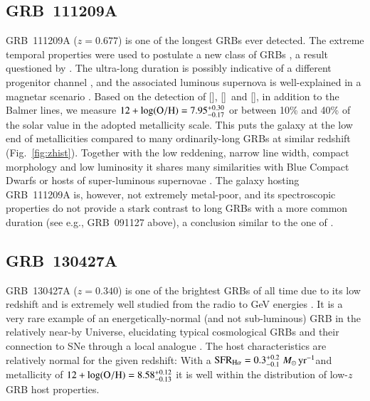 \documentclass[traditabstract, longauth]{aa}
\newcommand{\oh}{12+\log(\rm{O/H})}
\newcommand{\oii}{[\ion{O}{ii}]}
\newcommand{\oiii}{[\ion{O}{iii}]}
\newcommand{\neiii}{[\ion{Ne}{iii}]}
\newcommand{\Msunyr}{$M_\odot\,\rm{yr}^{-1}$}
\begin{document}
\begin{appendix}
\subsection{GRB~111209A} GRB~111209A ($z=0.677$) is one of the longest GRBs ever detected. The extreme temporal properties were used to postulate a new class of GRBs \citep{2013ApJ...766...30G, 2014ApJ...781...13L}, a result questioned by \citet{2013ApJ...778...54V}. The ultra-long duration is possibly indicative of a different progenitor channel \citep{2013ApJ...778...67N}, and the associated luminous supernova is well-explained in a magnetar scenario \citep{2015Kannsubm, 2015Greinersubm}. Based on the detection of \oii, \oiii\, and \neiii, in addition to the Balmer lines, we measure $\oh=7.95_{-0.17}^{+0.30}$ or between 10\% and 40\% of the solar value in the adopted metallicity scale. This puts the galaxy at the low end of metallicities compared to many ordinarily-long GRBs at similar redshift (Fig.~\ref{fig:zhist}). Together with the low reddening, narrow line width, compact morphology and low luminosity \citep{2014ApJ...781...13L} it shares many similarities with Blue Compact Dwarfs \citep[e.g.,][and references therein]{2003ApJS..147...29G} or hosts of super-luminous supernovae \citep[e.g.,][]{2014arXiv1409.8331L}. The galaxy hosting GRB~111209A is, however, not extremely metal-poor, and its spectroscopic properties do not provide a stark contrast to long GRBs with a more common duration (see e.g., GRB~091127 above), a conclusion similar to the one of \citet{2014ApJ...781...13L}.

\subsection{GRB~130427A} GRB~130427A ($z=0.340$) is one of the brightest GRBs of all time due to its low redshift and is extremely well studied from the radio to GeV energies \citep[e.g.,][]{2014ApJ...781...37P, 2014Sci...343...42A, 2014MNRAS.444.3151V}. It is a very rare example of an energetically-normal (and not sub-luminous) GRB in the relatively near-by Universe, elucidating typical cosmological GRBs and their connection to SNe through a local analogue \citep{2013ApJ...776...98X, 2014ApJ...792..115L, 2014A&A...567A..29M}. The host characteristics are relatively normal for the given redshift: With a $\rm{SFR}_{\rm{H\alpha}}= 0.3^{+0.2}_{-0.1}\,$\Msunyr and metallicity of $\oh=8.58_{-0.13}^{+0.12}$ it is well within the distribution of low-$z$ GRB host properties.

\end{appendix}
\end{document}
